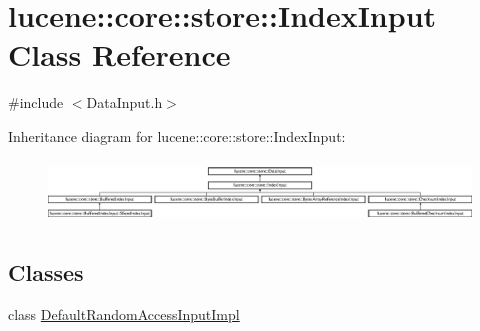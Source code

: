 \hypertarget{classlucene_1_1core_1_1store_1_1IndexInput}{}\section{lucene\+:\+:core\+:\+:store\+:\+:Index\+Input Class Reference}
\label{classlucene_1_1core_1_1store_1_1IndexInput}


{\ttfamily \#include $<$Data\+Input.\+h$>$}

Inheritance diagram for lucene\+:\+:core\+:\+:store\+:\+:Index\+Input\+:\begin{figure}[H]
\begin{center}
\leavevmode
\includegraphics[height=1.676647cm]{classlucene_1_1core_1_1store_1_1IndexInput}
\end{center}
\end{figure}
\subsection*{Classes}
\begin{DoxyCompactItemize}
\item 
class \mbox{\hyperlink{classlucene_1_1core_1_1store_1_1IndexInput_1_1DefaultRandomAccessInputImpl}{Default\+Random\+Access\+Input\+Impl}}
\end{DoxyCompactItemize}
